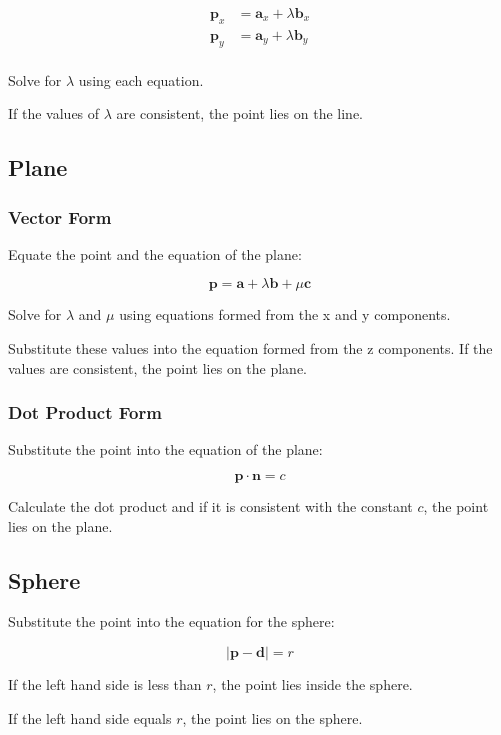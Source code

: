 \documentclass[a4paper,11pt]{article}
\newcommand{\bb}{\boldsymbol}
\begin{document}
$$
\begin{aligned}
\bb{p}_x & = \bb{a}_x + \lambda \bb{b}_x \\
\bb{p}_y & = \bb{a}_y + \lambda \bb{b}_y \\
\end{aligned}
$$

Solve for $\lambda$ using each equation.

If the values of $\lambda$ are consistent, the point lies on the line.


\subsection{Plane}

\subsubsection{Vector Form}

Equate the point and the equation of the plane:

$$
\bb{p} = \bb{a} + \lambda \bb{b} + \mu \bb{c}
$$

Solve for $\lambda$ and $\mu$ using equations formed from the x and y
components.

Substitute these values into the equation formed from the z components. If the
values are consistent, the point lies on the plane.


\subsubsection{Dot Product Form}

Substitute the point into the equation of the plane:

$$
\bb{p} \cdot \bb{n} = c
$$

Calculate the dot product and if it is consistent with the constant $c$, the
point lies on the plane.


\subsection{Sphere}

Substitute the point into the equation for the sphere:

$$
\lvert \bb{p} - \bb{d} \rvert = r
$$

If the left hand side is less than $r$, the point lies inside the sphere.

If the left hand side equals $r$, the point lies on the sphere.
\end{document}
